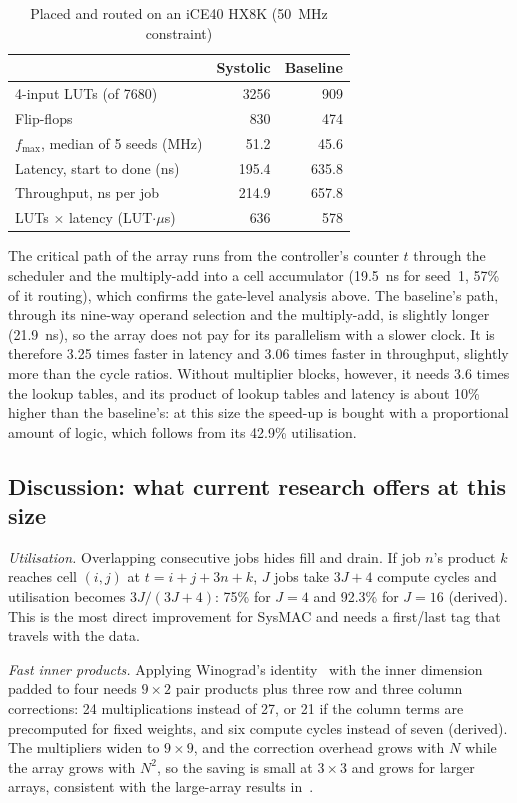 \documentclass[conference]{IEEEtran}
\begin{document}
\begin{table}[t]
\caption{Placed and routed on an iCE40 HX8K (50~MHz constraint)}
\label{tab:ice40}
\centering
\begin{tabular}{@{}lrr@{}}
\toprule
 & Systolic & Baseline \\
\midrule
4-input LUTs (of 7680) & 3256 & 909 \\
Flip-flops & 830 & 474 \\
$f_{\max}$, median of 5 seeds (MHz) & 51.2 & 45.6 \\
Latency, start to done (ns) & 195.4 & 635.8 \\
Throughput, ns per job & 214.9 & 657.8 \\
LUTs $\times$ latency (LUT$\cdot\mu$s) & 636 & 578 \\
\bottomrule
\end{tabular}
\end{table}

The critical path of the array runs from the controller's counter $t$ through the scheduler and the multiply-add into a cell accumulator (19.5~ns for seed~1, 57\% of it routing), which confirms the gate-level analysis above. The baseline's path, through its nine-way operand selection and the multiply-add, is slightly longer (21.9~ns), so the array does not pay for its parallelism with a slower clock. It is therefore 3.25 times faster in latency and 3.06 times faster in throughput, slightly more than the cycle ratios. Without multiplier blocks, however, it needs 3.6 times the lookup tables, and its product of lookup tables and latency is about 10\% higher than the baseline's: at this size the speed-up is bought with a proportional amount of logic, which follows from its 42.9\% utilisation.

\subsection{Discussion: what current research offers at this size}
\label{sec:discussion}
\emph{Utilisation.} Overlapping consecutive jobs hides fill and drain. If job $n$'s product $k$ reaches cell $(i,j)$ at $t = i + j + 3n + k$, $J$ jobs take $3J + 4$ compute cycles and utilisation becomes $3J/(3J+4)$: 75\% for $J = 4$ and 92.3\% for $J = 16$ (derived). This is the most direct improvement for SysMAC and needs a first/last tag that travels with the data.

\emph{Fast inner products.} Applying Winograd's identity~\cite{winograd1968, pogue2024} with the inner dimension padded to four needs $9 \times 2$ pair products plus three row and three column corrections: 24 multiplications instead of 27, or 21 if the column terms are precomputed for fixed weights, and six compute cycles instead of seven (derived). The multipliers widen to $9 \times 9$, and the correction overhead grows with $N$ while the array grows with $N^2$, so the saving is small at $3 \times 3$ and grows for larger arrays, consistent with the large-array results in~\cite{pogue2024}.
\end{document}

